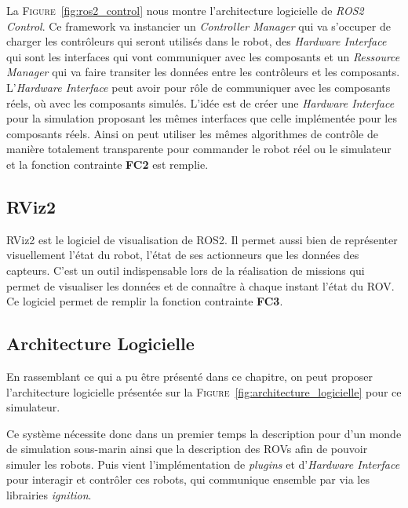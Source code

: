             La \textsc{Figure}~\ref{fig:ros2_control} nous montre l'architecture logicielle de \textit{ROS2 Control}. Ce framework va instancier un \textit{Controller Manager} qui va s'occuper de charger les contrôleurs qui seront utilisés dans le robot, des \textit{Hardware Interface} qui sont les interfaces qui vont communiquer avec les composants et un \textit{Ressource Manager} qui va faire transiter les données entre les contrôleurs et les composants. L'\textit{Hardware Interface} peut avoir pour rôle de communiquer avec les composants réels, où avec les composants simulés. L'idée est de créer une \textit{Hardware Interface} pour la simulation proposant les mêmes interfaces que celle implémentée pour les composants réels. Ainsi on peut utiliser les mêmes algorithmes de contrôle de manière totalement transparente pour commander le robot réel ou le simulateur et la fonction contrainte \textbf{FC2} est remplie.
        
        \subsection{RViz2}

            RViz2 est le logiciel de visualisation de \gls{ROS2}. Il permet aussi bien de représenter visuellement l'état du robot, l'état de ses actionneurs que les données des capteurs. C'est un outil indispensable lors de la réalisation de missions qui permet de visualiser les données et de connaître à chaque instant l'état du \gls{ROV}. Ce logiciel permet de remplir la fonction contrainte \textbf{FC3}.

        \subsection{Architecture Logicielle}

            En rassemblant ce qui a pu être présenté dans ce chapitre, on peut proposer l'architecture logicielle présentée sur la \textsc{Figure}~\ref{fig:architecture_logicielle} pour ce simulateur.
            
            Ce système nécessite donc dans un premier temps la description pour \gazebo{} d'un monde de simulation sous-marin ainsi que la description des \gls{ROV}s afin de pouvoir simuler les robots. Puis vient l'implémentation de \textit{plugins} \gazebo{} et d'\textit{Hardware Interface} pour interagir et contrôler ces robots, qui communique ensemble par via les librairies \textit{ignition}.
            
